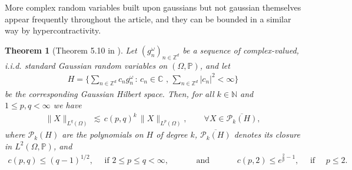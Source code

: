 \documentclass[11pt, xcolor = dvipsnames,reqno
]{amsart}
\newtheorem{thm}{Theorem}[section]
\theoremstyle{definition}
\theoremstyle{remark}
\begin{document}
    More complex random variables built upon gaussians but not gaussian themselves appear frequently throughout the article, 
    and they can be bounded in a similar way by hypercontractivity. 
    
    \begin{thm}[Theorem 5.10 in \cite{Janson1997}]\label{lemma:wiener-chaos}
    Let $(g_n^{\omega})_{n \in \mathbb{Z}^d}$ be a sequence of complex-valued, i.i.d. standard Gaussian random variables on $(\Omega,\mathbb{P})$, and let 
    \begin{align*}
        H = \Big\{\sum_{n \in \mathbb{Z}^d} c_n g_n^{\omega} \, : \, c_n \in \mathbb{C} \, \, , \, \sum_{n \in \mathbb{Z}^d} |c_n|^2 < \infty \Big\}
    \end{align*}
    be the corresponding Gaussian Hilbert space. 
    Then, for all $k \in \mathbb N$ and $1 \leq p,q < \infty$ we have
    \begin{align*}
        \|X\|_{L^q(\Omega)} \, \lesssim \, c(p,q)^k \, \|X\|_{L^p(\Omega)}, \qquad \forall X \in \overline{\mathcal{P}_k(H)},
    \end{align*}
    where $\mathcal{P}_k(H)$ are the polynomials on $H$ of degree $k$, $\overline{\mathcal{P}_k(H)}$ denotes its closure in $L^2(\Omega,\mathbb{P})$, and 
    \begin{align}
        c(p,q) \leq  (q-1)^{1/2}, \quad \text{ if } 2 \leq p \leq q < \infty,  \quad 
        \qquad \text{ and } \qquad \quad 
        c(p,2) \leq e^{\frac{2}{p} - 1}, \quad \text{ if } \quad p \leq 2. 
    \end{align}   
\end{thm}
\end{document}
